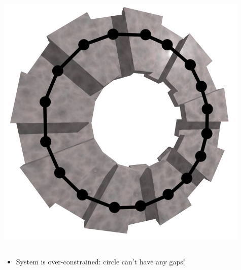 \documentclass[compress]{beamer}
\begin{document}
\begin{frame}
\begin{columns}
\includegraphics[width=\linewidth]{one_station.png}
\end{columns}

\vfill
\begin{itemize}
\item System is over-constrained: circle can't have any gaps!
\end{itemize}
\end{frame}
\end{document}
